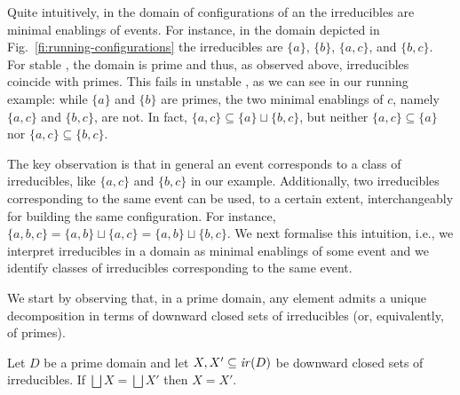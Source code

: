 Quite intuitively, in the domain of configurations of an {\esabbr} the
irreducibles are minimal enablings of events. For instance, in the
domain depicted in Fig.~\ref{fi:running-configurations} the
irreducibles are $\{a\}$, $\{b\}$, $\{ a, c \}$, and $\{ b, c \}$.
%
For stable {\esabbr}, the domain is prime and thus, as observed
above, irreducibles coincide with primes. This fails in unstable {\esabbr},
as we can see in our running example: while $\{a\}$ and
$\{b\}$ are primes, the two minimal enablings of $c$, namely
$\{ a, c \}$ and $\{ b, c \}$, are not. In fact,
$\{ a, c \} \subseteq \{ a \} \sqcup \{ b, c\}$, but neither
$\{ a, c \} \subseteq \{ a \}$ nor $\{ a, c\} \subseteq \{ b, c\}$.

%
The key observation is that in general an event corresponds to a class of
irreducibles, like $\{ a,c\}$ and $\{ b, c\}$ in our
example. Additionally, two irreducibles corresponding to the same
event can be used, to a certain extent, interchangeably for building
the same configuration. For instance,
$\{ a, b, c \} = \{a, b \} \sqcup \{ a, c \} = \{a, b \} \sqcup \{ b, c
\}$.
%
We next formalise this intuition, i.e., we interpret
irreducibles in a domain as minimal enablings of some event and we
identify classes of irreducibles corresponding to the same event.


We start by observing that, in a prime domain, any element admits a unique decomposition in terms of downward closed sets of irreducibles (or, equivalently, of primes).

\begin{lemma}
  \label{le:unique-decomposition}
  Let $D$ be a prime domain and let $X, X' \subseteq \mathop{\mathit{ir}({D})}$ be
  downward closed sets of irreducibles.
  If $\bigsqcup X = \bigsqcup X'$ then $X=X'$.
\end{lemma}


